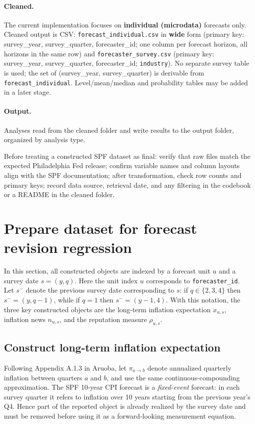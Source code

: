 \documentclass[11pt]{article}
\begin{document}
\paragraph{Cleaned.}
The current implementation focuses on \textbf{individual (microdata)} forecasts
only. Cleaned output is CSV: \texttt{forecast\_individual.csv} in \textbf{wide}
form (primary key: survey\_year, survey\_quarter, forecaster\_id; one
column per forecast horizon, all horizons in the same row) and \texttt{forecaster\_survey.csv}
(primary key: survey\_year, survey\_quarter, forecaster\_id; \texttt{industry}).
No separate survey table is used; the set of (survey\_year, survey\_quarter) is
derivable from \texttt{forecast\_individual}. Level/mean/median and probability
tables may be added in a later stage.

\paragraph{Output.}
Analyses read from the cleaned folder and write results to the output
folder, organized by analysis type.

Before treating a constructed SPF dataset as final: verify that raw files match
the expected Philadelphia Fed release; confirm variable names and column
layouts align with the SPF documentation; after transformation, check row
counts and primary keys; record data source, retrieval date, and any
filtering in the codebook or a README in the cleaned folder.

\section{Prepare dataset for forecast revision regression}

In this section, all constructed objects are indexed by a forecast unit $u$ and
a survey date $s=(y,q)$. Here the unit index $u$ corresponds to
\texttt{forecaster\_id}.
Let $s^{-}$ denote the previous survey date corresponding to $s$: if
$q \in \{2,3,4\}$ then $s^{-}=(y,q-1)$, while if $q=1$ then
$s^{-}=(y-1,4)$. With this notation, the three key constructed objects are the
long-term inflation expectation $x_{u,s}$, inflation news $n_{u,s}$, and the
reputation measure $\rho_{u,s}$.

\subsection{Construct long-term inflation expectation}

Following Appendix A.1.3 in Aruoba, let $\pi_{a \to b}$ denote annualized
quarterly inflation between quarters $a$ and $b$, and use the same
continuous-compounding approximation. The SPF 10-year CPI forecast is a
\emph{fixed-event} forecast: in each survey quarter it refers to inflation over
10 years starting from the previous year's Q4. Hence part of the reported
object is already realized by the survey date and must be removed before using
it as a forward-looking measurement equation.
\end{document}
